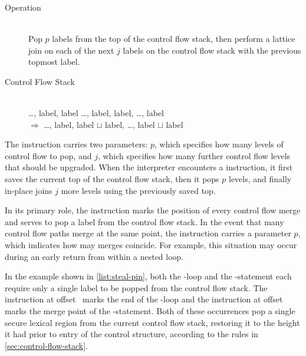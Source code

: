 \subsubsection{\popj}

\begin{samepage}
\begin{description}
\item[Operation] \hfill \\
 Pop $p$ labels from the top of the control flow stack, then perform a lattice join on each of the next $j$ labels on the control flow stack with the previous topmost label.
\item[Control Flow Stack] \hfill \\
  \ldots, label, label \ldots, label, label, \ldots, label\\
 $\Rightarrow$
 \ldots, label, label $\sqcup$ label, \ldots, label $\sqcup$ label
\end{description}
\end{samepage}

The \popj instruction carries two parameters: $p$, which specifies how many levels of control flow to pop, and $j$, which specifies how many further control flow levels that should be upgraded.
When the interpreter encounters a \popj instruction, it first saves the current top of the control flow stack, then it pops $p$ levels, and finally in-place joins $j$ more levels using the previously saved top.

In its primary role, the \popj instruction marks the position of every control flow merge and serves to pop a label from the control flow stack.
In the event that many control flow paths merge at the same point, the \popj instruction carries a parameter $p$, which indicates how may merges coincide.
For example, this situation may occur during an early return from within a nested loop.

In the example shown in \autoref{list:steal-pin}, both the -loop and the -statement each require only a single label to be popped from the control flow stack.
The \popj instruction at offset~ marks the end of the -loop and the \popj instruction at offset~ marks the merge point of the -statement.
Both of these occurrences pop a single secure lexical region from the current control flow stack, restoring it to the height it had prior to entry of the control structure, according to the rules in \autoref{sec:control-flow-stack}.

